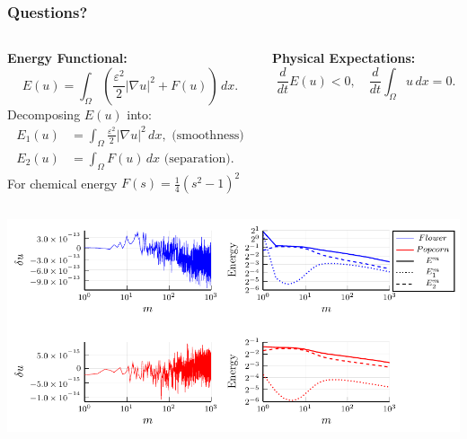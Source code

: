 \begin{frame}
\frametitle{Questions?}
\end{frame}

\begin{frame}
\begin{center}
\begin{columns}
\begin{column}{0.5\textwidth}
    \textbf{Energy Functional:}
    \begin{equation*}
        E(u) = \int_{\Omega} \left( \frac{\varepsilon^2}{2} |\nabla u|^2 + F(u) \right) \, dx.
    \end{equation*}
    Decomposing \( E(u) \) into:
    \begin{align*}
        E_{1}(u) &= \int_{\Omega} \frac{\varepsilon^2}{2} |\nabla u|^2 \, dx, \text{ (smoothness)} \\
        E_{2}(u) &= \int_{\Omega} F(u) \, dx \text{ (separation)}.
    \end{align*}
    For chemical energy \( F(s)=\frac{1}{4}\left(s^2-1\right)^2 \)
\end{column}
\begin{column}{0.5\textwidth}
    \textbf{Physical Expectations:}
    \begin{equation*}
        \frac{d}{dt} E(u) < 0, \quad \frac{d}{dt} \int_{\Omega} u \, dx = 0.
    \end{equation*}
\end{column}
\end{columns}
\end{center}
\end{frame}

\begin{frame}
\begin{center}
    \includegraphics[width=1.0\textwidth]{CH-example/physical_energy.pdf}
\end{center}
\end{frame}


